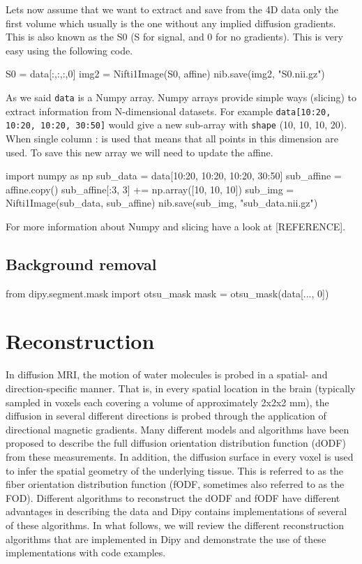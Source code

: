 \documentclass{bioinfo}
\begin{document}
Lets now assume that we want to extract and save from the 4D data only the first volume which usually is the one without any implied diffusion gradients. This is also known as the S0 (S for signal, and 0 for no gradients). This is very easy using the following code.
\begin{python}
S0 = data[:,:,:,0]
img2 = Nifti1Image(S0, affine)
nib.save(img2, "S0.nii.gz")
\end{python}
As we said \texttt{data} is a Numpy array. Numpy arrays provide simple ways (slicing) to extract information from N-dimensional datasets. For example \texttt{data[10:20, 10:20, 10:20, 30:50]} would give a new sub-array with \texttt{shape} (10, 10, 10, 20). When single column : is used that means that all points in this dimension are used. To save this new array we will need to update the affine. 
\begin{python}
import numpy as np
sub_data = data[10:20, 10:20, 10:20, 30:50]
sub_affine = affine.copy()
sub_affine[:3, 3] += np.array([10, 10, 10])
sub_img = Nifti1Image(sub_data, sub_affine)
nib.save(sub_img, "sub_data.nii.gz")
\end{python} 
For more information about Numpy and slicing have a look at [REFERENCE].

\subsection{Background removal}

\begin{python}
from dipy.segment.mask import otsu_mask
mask = otsu_mask(data[..., 0])
\end{python}

\section{Reconstruction}

In diffusion MRI, the motion of water molecules is probed in a spatial- and direction-specific manner. That is, in every spatial location in the brain (typically sampled in voxels each covering a volume of approximately 2x2x2 mm), the diffusion in several different directions is probed through the application of directional magnetic gradients. Many different models and algorithms have been proposed to describe the full diffusion orientation distribution function (dODF) from these measurements. In addition, the diffusion surface in every voxel is used to infer the spatial geometry of the underlying tissue. This is referred to as the fiber orientation distribution function (fODF, sometimes also referred to as the FOD). Different algorithms to reconstruct the dODF and fODF have different advantages in describing the data and Dipy contains implementations of several of these algorithms. In what follows, we will review the different reconstruction algorithms that are implemented in Dipy and demonstrate the use of these implementations with code examples.  
\end{document}
